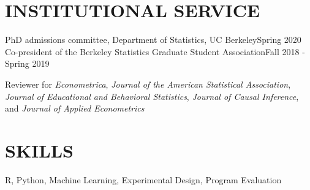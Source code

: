 \documentclass{res}
\begin{document}
\begin{resume}
\section{INSTITUTIONAL SERVICE}

\medskip

\hspace{0.2em} 
PhD admissions committee, Department of Statistics, UC Berkeley\hfill Spring 2020
\vskip -8pt
\hspace{0.2em} 
Co-president of the Berkeley Statistics Graduate Student Association\hfill Fall 2018 - Spring 2019

\vskip -8pt
\hspace{0.2em} Reviewer for {\it Econometrica}, {\it Journal of the American Statistical Association}, {\it Journal of Educational and Behavioral Statistics}, {\it Journal of Causal Inference}, and {\it Journal of Applied Econometrics}


\section{SKILLS}
R, Python, Machine Learning, Experimental Design, Program Evaluation  %



\end{resume}
\end{document}
